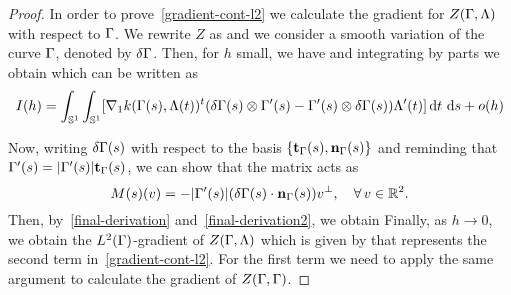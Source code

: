 \begin{proof} 
In order to prove~\eqref{gradient-cont-l2} we calculate the gradient for $Z(\Gamma,\Lambda)$ with respect to $\Gamma$. We rewrite $Z$ as 
and we consider a smooth variation of the curve $\Gamma$, denoted by $\delta \Gamma$. Then, for $h$ small, we have
and integrating by parts we obtain
which can be written as
\begin{equation}\label{final-derivation} 
	I(h)=\displaystyle{\int_{\mathbb{S}^1}\int_{\mathbb{S}^1}[ \nabla_1 k(\Gamma(s),\Lambda(t))^t(\delta\Gamma(s) \otimes  
	\Gamma'(s) - \Gamma'(s)\otimes\delta\Gamma(s)  )  \Lambda'(t) ]\, \mathrm{d}t\,  \,\mathrm{d}s + o(h)}
\end{equation}

Now, writing $\delta \Gamma(s)$ with respect to the basis $\{\mathbf{t}_\Gamma(s), \mathbf{n}_\Gamma(s)\}$ and reminding that $\Gamma'(s)=|\Gamma'(s)|\mathbf{t}_\Gamma(s)$, we can show that the matrix
acts as 
\begin{equation}\label{final-derivation2}
	 M(s)(v) = - |\Gamma'(s)|(\delta\Gamma(s)\cdot\mathbf{n}_\Gamma(s)) {v}^\bot, \quad \forall \, v\in \mathbb{R}^2.
\end{equation}
Then, by~\eqref{final-derivation} and~\eqref{final-derivation2}, we obtain
Finally, as $h\rightarrow 0$, we obtain the $L^2(\Gamma)$-gradient of $Z(\Gamma,\Lambda)$  which is given by
that represents  the second term in~\eqref{gradient-cont-l2}. For the first term we need to apply the same argument to calculate the gradient of $Z(\Gamma,\Gamma)$.
\end{proof}


